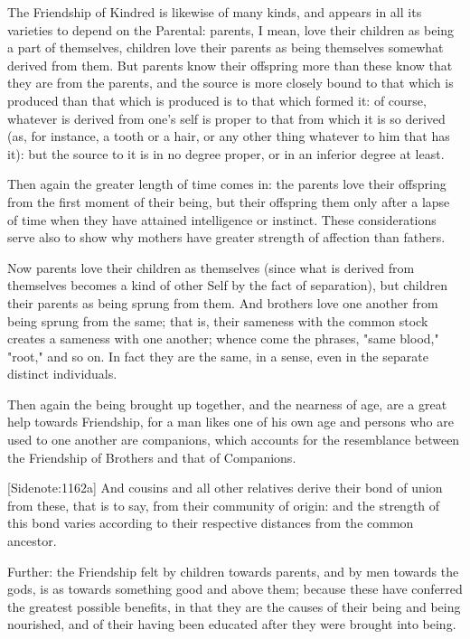 The Friendship of Kindred is likewise of many kinds, and appears in all
its varieties to depend on the Parental: parents, I mean, love their
children as being a part of themselves, children love their parents as
being themselves somewhat derived from them. But parents know their
offspring more than these know that they are from the parents, and the
source is more closely bound to that which is produced than that which
is produced is to that which formed it: of course, whatever is derived
from one's self is proper to that from which it is so derived (as, for
instance, a tooth or a hair, or any other thing whatever to him that
has it): but the source to it is in no degree proper, or in an inferior
degree at least.

Then again the greater length of time comes in: the parents love their
offspring from the first moment of their being, but their offspring
them only after a lapse of time when they have attained intelligence
or instinct. These considerations serve also to show why mothers have
greater strength of affection than fathers.

Now parents love their children as themselves (since what is derived
from themselves becomes a kind of other Self by the fact of separation),
but children their parents as being sprung from them. And brothers love
one another from being sprung from the same; that is, their sameness
with the common stock creates a sameness with one another; whence come
the phrases, "same blood," "root," and so on. In fact they are the same,
in a sense, even in the separate distinct individuals.

Then again the being brought up together, and the nearness of age, are
a great help towards Friendship, for a man likes one of his own age and
persons who are used to one another are companions, which accounts
for the resemblance between the Friendship of Brothers and that of
Companions.

[Sidenote:1162a] And cousins and all other relatives derive their bond
of union from these, that is to say, from their community of origin: and
the strength of this bond varies according to their respective distances
from the common ancestor.

Further: the Friendship felt by children towards parents, and by men
towards the gods, is as towards something good and above them; because
these have conferred the greatest possible benefits, in that they are
the causes of their being and being nourished, and of their having been
educated after they were brought into being.

